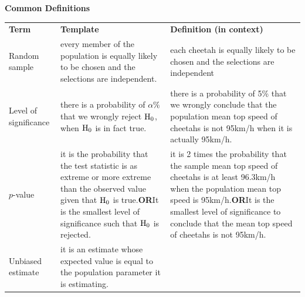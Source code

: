 \noindent\begin{minipage}{\textwidth}
{\large\bfseries\color{blue!50!black}Common Definitions}\par\smallskip
\centering\renewcommand{\arraystretch}{1.05}\footnotesize
\begin{tabular}{|L{2.3cm}|L{6.45cm}|L{6.45cm}|}\hline
\textbf{Term} & \textbf{Template} & \textbf{Definition (in context)}\\\Xhline{2pt}
Random sample & every member of the population is equally likely to be chosen and the selections are independent. & each cheetah is equally likely to be chosen and the selections are independent\\\hline
Level of significance & there is a probability of $\alpha\%$ that we wrongly reject $\mathrm{H}_{0}$, when $\mathrm{H}_{0}$ is in fact true. & there is a probability of 5\% that we wrongly conclude that the population mean top speed of cheetahs is not 95km/h when it is actually 95km/h.\\\hline
$p$-value & it is the probability that the test statistic is as extreme or more extreme than the observed value given that $\mathrm{H}_{0}$ is true.\newline \textbf{OR}\newline It is the smallest level of significance such that $\mathrm{H}_{0}$ is rejected. & it is 2 times the probability that the sample mean top speed of cheetahs is at least 96.3km/h when the population mean top speed is 95km/h.\newline \textbf{OR}\newline It is the smallest level of significance to conclude that the mean top speed of cheetahs is not 95km/h.\\\hline
Unbiased estimate & it is an estimate whose expected value is equal to the population parameter it is estimating. & \\\hline
\end{tabular}
\end{minipage}
